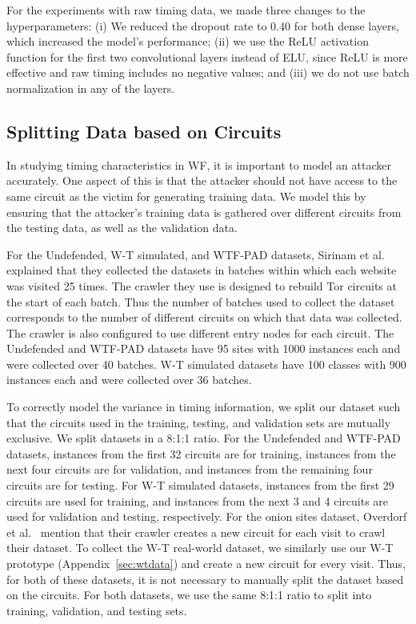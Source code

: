 \documentclass[USenglish,oneside,twocolumn]{article}
\begin{document}
For the experiments with raw timing data, we made three changes to the hyperparameters: (i) We reduced the dropout rate to 0.40 for both dense layers, which increased the model's performance; (ii) we use the ReLU activation function for the first two convolutional layers instead of ELU, since ReLU is more effective and raw timing includes no negative values; and (iii) we do not use batch normalization in any of the layers.





\subsection{Splitting Data based on Circuits}
\label{split_circuits}

In studying timing characteristics in WF, it is important to model an attacker accurately. One aspect of this is that the attacker should not have access to the same circuit as the victim for generating training data. We model this by ensuring that the attacker's training data is gathered over different circuits from the testing data, as well as the validation data.  

For the Undefended, W-T simulated, and WTF-PAD datasets, Sirinam et al. explained that they collected the datasets in batches within which each website was visited 25 times. The crawler they use is designed to rebuild Tor circuits at the start of each batch. Thus the number of batches used to collect the dataset corresponds to the number of different circuits on which that data was collected. The crawler is also configured to use different entry nodes for each circuit. The Undefended and WTF-PAD datasets have 95 sites with 1000 instances each and were collected over 40 batches. W-T simulated datasets have 100 classes with 900 instances each and were collected over 36 batches.

To correctly model the variance in timing information, we split our dataset such that the circuits used in the training, testing, and validation sets are mutually exclusive. 
We split datasets in a 8:1:1 ratio. For the Undefended and WTF-PAD datasets, instances from the first 32 circuits are for training, instances from the next four circuits 
are for validation, and instances from the remaining four circuits 
are for testing. For W-T simulated datasets, instances from the first 29 circuits are used for training, and instances from the next 3 and 4 circuits are used for validation and testing, respectively. For the onion sites dataset, Overdorf et al.~\cite{overdorf2017unique} mention that their crawler creates a new circuit for each visit to crawl their dataset. To collect the W-T real-world dataset, we similarly use our W-T prototype (Appendix~\ref{sec:wtdata}) and create a new circuit for every visit. Thus, for both of these datasets, it is not necessary to manually split the dataset based on the circuits. For both datasets, we use the same 8:1:1 ratio to split into training, validation, and testing sets. 
\end{document}
